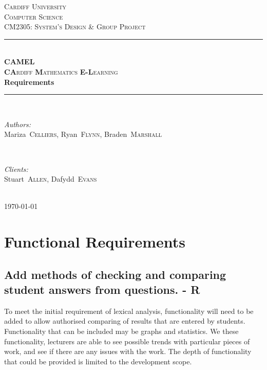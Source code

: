 \documentclass[12pt]{article}
\begin{document}
	\begin{titlepage}
		\newcommand{\HRule}{\rule{\linewidth}{0.5mm}}

		\center

		\textsc{\LARGE Cardiff University}\\[1.5cm]
		\textsc{\Large Computer Science}\\[0.5cm]
		\textsc{\large CM2305: System's Design \& Group Project}\\[0.5cm]

		\HRule \\[0.4cm]
		\textsc{\Large \textbf{CAMEL}}\\[0.1cm]
		\textsc{\Large \textbf{CA}rdiff \textbf{M}athematics \textbf{E-L}earning}\\[0.7cm]
		{\huge\bfseries Requirements}\\[0.4cm]
		\HRule \\[1.5cm]

		\begin{minipage}{0.4\textwidth}
			\begin{flushleft} \large
				\emph{Authors:}\\
				\mbox{Mariza \textsc{Celliers}}, \mbox{Ryan \textsc{Flynn}}, \mbox{Braden \textsc{Marshall}}
			\end{flushleft}
		\end{minipage}
		~
		\begin{minipage}{0.4\textwidth}
			\begin{flushright} \large
				\emph{Clients:} \\
				\mbox{Stuart \textsc{Allen}}, \mbox{Dafydd \textsc{Evans}}
			\end{flushright}
		\end{minipage}\\[3cm]

		{\large \today}\\[2cm]

		\vfill
	\end{titlepage}


	\tableofcontents

	\newpage

	\section{Functional Requirements}
	\subsection{Add methods of checking and comparing student answers from questions. - R}
	To meet the initial requirement of lexical analysis, functionality will need to be added to allow authorised comparing of results that are entered by students. Functionality that can be included may be graphs and statistics. We these functionality, lecturers are able to see possible trends with particular pieces of work, and see if there are any issues with the work. The depth of functionality that could be provided is limited to the development scope.
\end{document}
